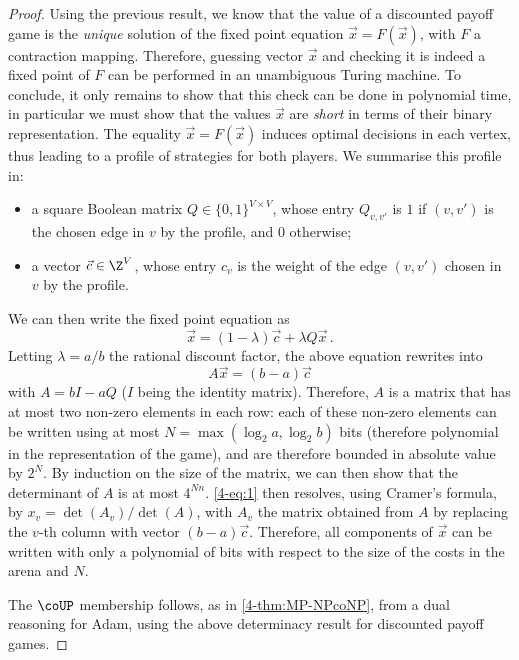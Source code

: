 \begin{proof}
  Using the previous result, we know that the value of a
  discounted payoff game is the \emph{unique} solution of the fixed
  point equation $\vec x = F(\vec x)$, with $F$ a contraction
  mapping. Therefore, guessing vector $\vec x$ and checking it is
  indeed a fixed point of $F$ can be performed in an unambiguous
  Turing machine. To conclude, it only remains to show that this check
  can be done in polynomial time, in particular we must show that the
  values $\vec x$ are \emph{short} in terms of their binary
  representation. The equality $\vec x = F(\vec x)$ induces optimal
  decisions in each vertex, thus leading to a profile of strategies
  for both players. We summarise this profile
  in: \begin{itemize} \item a square Boolean matrix
  $Q\in \{0,1\}^{V\times V}$, whose entry $Q_{v,v'}$ is $1$ if
  $(v,v')$ is the chosen edge in $v$ by the profile, and $0$
  otherwise; \item a vector $\vec c\in \Z^{V}$, whose entry $c_v$ is
  the weight of the edge $(v,v')$ chosen in $v$ by the
  profile.  \end{itemize} We can then write the fixed point equation
  as \[\vec x = (1-\lambda) \vec c + \lambda Q \vec x\,.\] Letting
  $\lambda = a/b$ the rational discount factor, the above equation
  rewrites into \begin{equation} A\vec x = (b-a)\vec
  c\label{4-eq:1} \end{equation} with $A= b I- a Q$ ($I$ being the
  identity matrix). Therefore, $A$ is a matrix that has at most two
  non-zero elements in each row: each of these non-zero elements can
  be written using at most $N=\max(\log_2 a,\log_2 b)$ bits (therefore
  polynomial in the representation of the game), and are therefore
  bounded in absolute value by $2^N$. By induction on the size of the
  matrix, we can then show that the determinant of $A$ is at most
  $4^{Nn}$. \cref{4-eq:1} then resolves, using Cramer's formula, by
  $x_v = \det (A_v) / \det (A)$, with $A_v$ the matrix obtained from $A$
  by replacing the $v$-th column with vector $(b-a)\vec c$. Therefore,
  all components of $\vec x$ can be written with only a polynomial of
  bits with respect to the size of the costs in the arena and $N$.

  The $\coUP$ membership follows, as in \cref{4-thm:MP-NPcoNP}, from a
  dual reasoning for Adam, using the above determinacy result for
  discounted payoff games. 
\end{proof}

